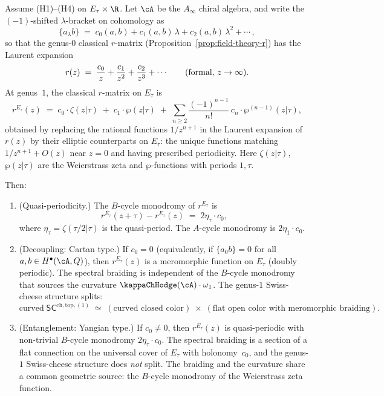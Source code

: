 \begin{theorem}
Assume \textrm{(H1)--(H4)} on $E_\tau \times \R$.
Let $\cA$ be the $A_\infty$ chiral algebra, and write the
$(-1)$-shifted $\lambda$-bracket on cohomology as
\[
\{a {}_\lambda b\}
\;=\;
c_0(a,b) + c_1(a,b)\,\lambda + c_2(a,b)\,\lambda^2 + \cdots\,,
\]
so that the genus-$0$ classical $r$-matrix
\textup{(}Proposition~\textup{\ref{prop:field-theory-r})} has the
Laurent expansion
\[
r(z)
\;=\;
\frac{c_0}{z} + \frac{c_1}{z^2} + \frac{c_2}{z^3} + \cdots
\qquad \text{\textup{(}formal, $z \to \infty$\textup{)}}.
\]
At genus~$1$, the classical $r$-matrix on $E_\tau$ is
\begin{equation}
r^{E_\tau}(z)
\;=\;
c_0 \cdot \zeta(z|\tau)
\;+\;
c_1 \cdot \wp(z|\tau)
\;+\;
\sum_{n \ge 2}
 \frac{(-1)^{n-1}}{n!}\,
 c_n \cdot \wp^{(n-1)}(z|\tau),
\end{equation}
obtained by replacing the rational functions $1/z^{n+1}$ in the
Laurent expansion of $r(z)$ by their elliptic counterparts on
$E_\tau$: the unique functions matching $1/z^{n+1} + O(z)$
near $z = 0$ and having prescribed periodicity. Here
$\zeta(z|\tau)$, $\wp(z|\tau)$ are the Weierstrass zeta and
$\wp$-functions with periods $1, \tau$.

Then:
\begin{enumerate}[label=\textup{(\alph*)}]
\item %
\textup{(Quasi-periodicity.)}
The $B$-cycle monodromy of $r^{E_\tau}$ is
\begin{equation}
r^{E_\tau}(z + \tau) - r^{E_\tau}(z)
\;=\;
2\eta_\tau \cdot c_0,
\end{equation}
where $\eta_\tau = \zeta(\tau/2|\tau)$ is the quasi-period. The
$A$-cycle monodromy is $2\eta_1 \cdot c_0$.

\item %
\textup{(Decoupling: Cartan type.)}
If $c_0 = 0$ (equivalently, if
$\{a {}_0 b\} = 0$ for all
$a, b \in H^\bullet(\cA, Q)$), then $r^{E_\tau}(z)$ is a
meromorphic function on $E_\tau$ \textup{(}doubly
periodic\textup{)}.
The spectral braiding is independent of the $B$-cycle monodromy
that sources the curvature $\kappaChHodge(\cA) \cdot \omega_1$. The
genus-$1$ Swiss-cheese structure splits:
\[
\text{curved}\;\mathsf{SC}^{\mathrm{ch,top},(1)}
\;\simeq\;
(\text{curved closed color})
\;\times\;
(\text{flat open color with meromorphic braiding}).
\]

\item %
\textup{(Entanglement: Yangian type.)}
If $c_0 \ne 0$, then $r^{E_\tau}(z)$ is quasi-periodic with
non-trivial $B$-cycle monodromy $2\eta_\tau \cdot c_0$. The
spectral braiding is a section of a flat connection on the universal
cover of $E_\tau$ with holonomy~$c_0$, and the genus-$1$
Swiss-cheese structure does \emph{not} split.
The braiding and the curvature share a common geometric source:
the $B$-cycle monodromy of the Weierstrass zeta function.
\end{enumerate}
\end{theorem}

